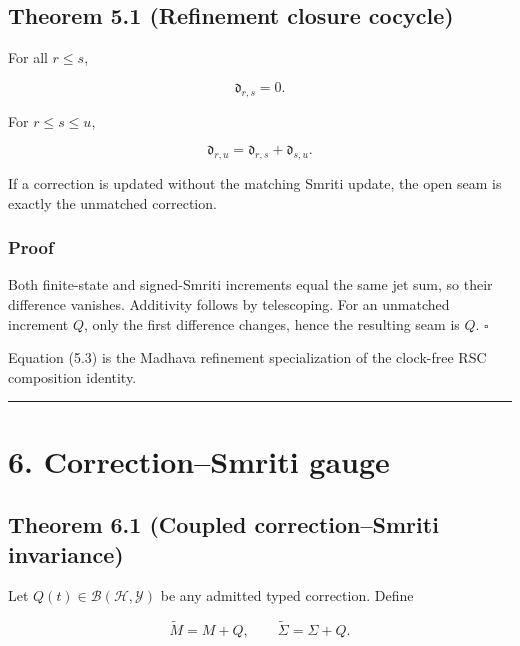 \hypertarget{theorem-5.1-refinement-closure-cocycle}{%
\subsection{Theorem 5.1 (Refinement closure cocycle)}\label{theorem-5.1-refinement-closure-cocycle}}

For all \(r\le s\),

\[
\boxed{\mathfrak d_{r,s}=0.}
\tag{5.2}
\]

For \(r\le s\le u\),

\[
\boxed{
\mathfrak d_{r,u}
=\mathfrak d_{r,s}+\mathfrak d_{s,u}.
}
\tag{5.3}
\]

If a correction is updated without the matching Smriti update, the open seam
is exactly the unmatched correction.

\hypertarget{proof-2}{%
\subsubsection{Proof}\label{proof-2}}

Both finite-state and signed-Smriti increments equal the same jet sum, so their
difference vanishes. Additivity follows by telescoping. For an unmatched
increment \(Q\), only the first difference changes, hence the resulting seam is
\(Q\). \(\square\)

Equation (5.3) is the Madhava refinement specialization of the clock-free RSC
composition identity.

\begin{center}\rule{0.5\linewidth}{0.5pt}\end{center}

\hypertarget{correctionsmriti-gauge}{%
\section{6. Correction--Smriti gauge}\label{correctionsmriti-gauge}}

\hypertarget{theorem-6.1-coupled-correctionsmriti-invariance}{%
\subsection{Theorem 6.1 (Coupled correction--Smriti invariance)}\label{theorem-6.1-coupled-correctionsmriti-invariance}}

Let \(Q(t)\in\mathcal B(\mathcal H,\mathcal Y)\) be any admitted typed
correction. Define

\[
\widetilde M=M+Q,
\qquad
\widetilde\Sigma=\Sigma+Q.
\tag{6.1}
\]


